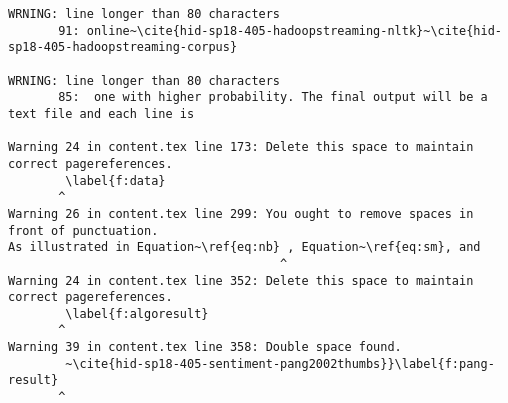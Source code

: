 \begin{tiny}
\begin{verbatim}
WRNING: line longer than 80 characters
       91: online~\cite{hid-sp18-405-hadoopstreaming-nltk}~\cite{hid-sp18-405-hadoopstreaming-corpus}

WRNING: line longer than 80 characters
       85:  one with higher probability. The final output will be a text file and each line is 

Warning 24 in content.tex line 173: Delete this space to maintain correct pagereferences.
        \label{f:data}  
       ^
Warning 26 in content.tex line 299: You ought to remove spaces in front of punctuation.
As illustrated in Equation~\ref{eq:nb} , Equation~\ref{eq:sm}, and   
                                      ^
Warning 24 in content.tex line 352: Delete this space to maintain correct pagereferences.
        \label{f:algoresult}  
       ^
Warning 39 in content.tex line 358: Double space found.
        ~\cite{hid-sp18-405-sentiment-pang2002thumbs}}\label{f:pang-result}  
       ^
\end{verbatim}
\end{tiny}
